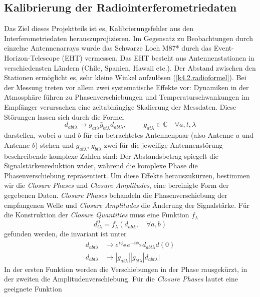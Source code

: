 \subsection{Kalibrierung der Radiointerferometriedaten}
Das Ziel dieses Projektteils ist es, Kalibrierungsfehler aus den Interferometriedaten herauszuprojizieren. Im Gegensatz zu Beobachtungen durch einzelne Antennenarrays wurde das Schwarze Loch M87* durch das Event-Horizon-Telescope (EHT) vermessen. Das EHT besteht aus Antennenstationen in verschiedensten Ländern (Chile, Spanien, Hawaii etc.). Der Abstand zwischen den Stationen ermöglicht es, sehr kleine Winkel aufzulösen (\cref{k4.2.radioformel}).
Bei der Messung treten vor allem zwei systematische Effekte vor: Dynamiken in der Atmosphäre führen zu Phasenverschiebungen und Temperaturschwankungen im Empfänger verursachen eine zeitabhängige Skalierung der Messdaten. Diese Störungen lassen sich durch die Formel
\begin{equation}
d_{abt\lambda}\rightarrow g_{at\lambda} \bar{g}_{bt\lambda}d_{abt\lambda}, \hspace{1cm} g_{at \lambda} \in \mathbb{C} \quad \forall a,t,\lambda
\end{equation}
darstellen, wobei $a$ und $b$ für ein betrachtetes Antennenpaar (also Antenne $a$ und Antenne $b$) stehen und $g_{at\lambda}$,  $g_{bt\lambda}$ zwei für die jeweilige Antennenstörung beschreibende komplexe Zahlen sind: Der Abstandsbetrag spiegelt die Signalstärkenreduktion wider, während die komplexe Phase die Phasenverschiebung repräsentiert.
Um diese Effekte herauszukürzen, bestimmen wir die \emph{Closure Phases} und \emph{Closure Amplitudes}, eine bereinigte Form der gegebenen Daten. \emph{Closure Phases} behandeln die Phasenverschiebung der empfangenen Welle und \emph{Closure Amplitudes} die Änderung der Signalstärke. Für die Konstruktion der \emph{Closure Quantities} muss eine Funktion $f_{\lambda}$
\begin{equation}
d^0_{t\lambda}=f_{\lambda}(d_{ab\lambda},\quad \forall a,b)
\end{equation}
gefunden werden, die invariant ist unter
\begin{align}
d_{abt\lambda} &\rightarrow e^{i \phi_{at}} e^{-i\phi_{bt}} d_{abt\lambda}d(0)\\
d_{abt\lambda}&\rightarrow|g_{at\lambda}||g_{bt\lambda}|d_{abt\lambda}|
\end{align}
In der ersten Funktion werden die Verschiebungen in der Phase rausgekürzt, in der zweiten die Amplitudenverschiebung.
Für die \emph{Closure Phases} lautet eine geeignete Funktion
